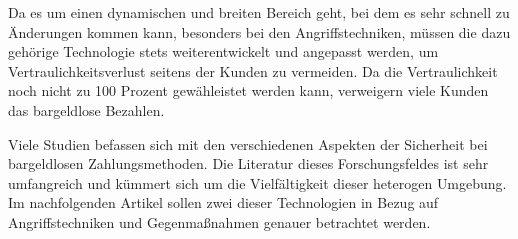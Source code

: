 

Da es um einen dynamischen und breiten Bereich geht, bei dem es sehr schnell zu Änderungen kommen kann, 
besonders bei den Angriffstechniken, müssen die dazu gehörige \cite{refip:NYRS} Technologie stets 
weiterentwickelt und angepasst werden, um Vertraulichkeitsverlust seitens der Kunden zu vermeiden. 
Da die Vertraulichkeit noch nicht zu 100 Prozent gewähleistet werden kann, verweigern viele Kunden
das bargeldlose Bezahlen.

Viele Studien befassen sich mit den verschiedenen Aspekten der Sicherheit bei bargeldlosen Zahlungsmethoden.
Die Literatur dieses Forschungsfeldes ist sehr umfangreich und kümmert sich um die Vielfältigkeit 
dieser heterogen \cite{refip:GMPS} Umgebung. Im nachfolgenden Artikel sollen zwei dieser Technologien 
in Bezug auf Angriffstechniken und Gegenmaßnahmen genauer betrachtet werden.

